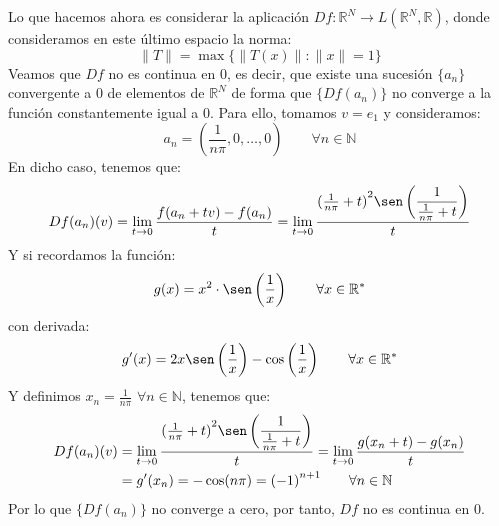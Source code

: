 \begin{ejercicio}
    \noindent
    Lo que hacemos ahora es considerar la aplicación $Df:\mathbb{R}^N\to L(\mathbb{R}^N,\mathbb{R})$, donde consideramos en este último espacio la norma:
    \begin{equation*}
        \|T\| = \max \{\|T(x)\| : \|x\| = 1\}
    \end{equation*}
    Veamos que $Df$ no es continua en $0$, es decir, que existe una sucesión $\{a_n\}$ convergente a $0$ de elementos de $\mathbb{R}^N$ de forma que $\{Df(a_n)\}$ no converge a la función constantemente igual a $0$. Para ello, tomamos $v = e_1$ y consideramos:
    \begin{equation*}
        a_n = \left(\dfrac{1}{n\pi}, 0, \ldots, 0\right) \qquad \forall n\in \mathbb{N}
    \end{equation*}
    En dicho caso, tenemos que:
    \begin{equation*}
        Df(a_n)(v) = \lim_{t\to0}\dfrac{f(a_n+tv)-f(a_n)}{t} = \lim_{t\to0}  \dfrac{{(\frac{1}{n\pi}+t)}^{2}\sen\left(\dfrac{1}{\frac{1}{n\pi}+t}\right)}{t}  
    \end{equation*}
    Y si recordamos la función:
    \begin{equation*}
        g(x) = x^2\cdot \sen\left(\dfrac{1}{x}\right)\qquad \forall x\in \mathbb{R}^\ast
    \end{equation*}
    con derivada:
    \begin{equation*}
        g'(x) = 2x\sen\left(\dfrac{1}{x}\right) - \cos\left(\dfrac{1}{x}\right) \qquad \forall x\in \mathbb{R}^\ast
    \end{equation*}
    Y definimos $x_n = \frac{1}{n\pi}$ $\forall n\in \mathbb{N}$, tenemos que:
    \begin{align*}
        Df(a_n)(v) &= \lim_{t\to0}  \dfrac{{(\frac{1}{n\pi}+t)}^{2}\sen\left(\dfrac{1}{\frac{1}{n\pi}+t}\right)}{t}   = \lim_{t\to0}\dfrac{g(x_n+t)-g(x_n)}{t} \\ &= g'(x_n) = -\cos(n\pi) = {(-1)}^{n+1} \qquad \forall n\in \mathbb{N}
    \end{align*}
    Por lo que $\{Df(a_n)\}$ no converge a cero, por tanto, $Df$ no es continua en $0$.
\end{ejercicio}
